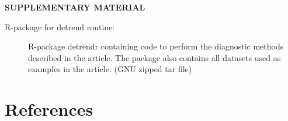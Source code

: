 \documentclass[12pt]{article}
\begin{document}
	
	\bigskip
	\begin{center}
		{\large\bf SUPPLEMENTARY MATERIAL}
	\end{center}
	
	\begin{description}
		
		\item[R-package for detrend routine:] R-package detrendr containing code to perform the diagnostic methods described in the article. The package also contains all datasets used as examples in the article. (GNU zipped tar file)
				
	\end{description}
	
	\section{References}

	
	
	
	
\end{document}
